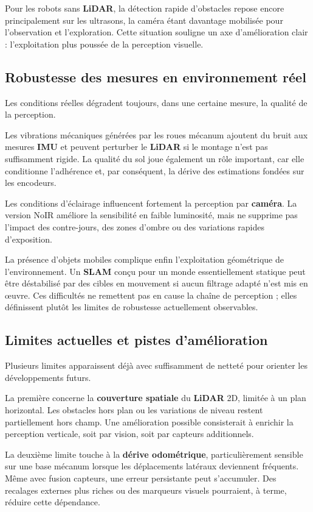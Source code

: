 \documentclass[11pt,a4paper]{report}
\newcommand{\kw}[1]{\textbf{#1}}
\begin{document}
Pour les robots sans \kw{LiDAR}, la détection rapide d’obstacles repose encore principalement sur les ultrasons, la caméra étant davantage mobilisée pour l’observation et l’exploration. Cette situation souligne un axe d’amélioration clair : l’exploitation plus poussée de la perception visuelle.

\subsection{Robustesse des mesures en environnement réel}

Les conditions réelles dégradent toujours, dans une certaine mesure, la qualité de la perception.

Les vibrations mécaniques générées par les roues mécanum ajoutent du bruit aux mesures \kw{IMU} et peuvent perturber le \kw{LiDAR} si le montage n’est pas suffisamment rigide. La qualité du sol joue également un rôle important, car elle conditionne l’adhérence et, par conséquent, la dérive des estimations fondées sur les encodeurs.

Les conditions d’éclairage influencent fortement la perception par \kw{caméra}. La version NoIR améliore la sensibilité en faible luminosité, mais ne supprime pas l’impact des contre-jours, des zones d’ombre ou des variations rapides d’exposition.

La présence d’objets mobiles complique enfin l’exploitation géométrique de l’environnement. Un \kw{SLAM} conçu pour un monde essentiellement statique peut être déstabilisé par des cibles en mouvement si aucun filtrage adapté n’est mis en œuvre. Ces difficultés ne remettent pas en cause la chaîne de perception ; elles définissent plutôt les limites de robustesse actuellement observables.

\subsection{Limites actuelles et pistes d’amélioration}

Plusieurs limites apparaissent déjà avec suffisamment de netteté pour orienter les développements futurs.

La première concerne la \kw{couverture spatiale} du \kw{LiDAR} 2D, limitée à un plan horizontal. Les obstacles hors plan ou les variations de niveau restent partiellement hors champ. Une amélioration possible consisterait à enrichir la perception verticale, soit par vision, soit par capteurs additionnels.

La deuxième limite touche à la \kw{dérive odométrique}, particulièrement sensible sur une base mécanum lorsque les déplacements latéraux deviennent fréquents. Même avec fusion capteurs, une erreur persistante peut s’accumuler. Des recalages externes plus riches ou des marqueurs visuels pourraient, à terme, réduire cette dépendance.
\end{document}
